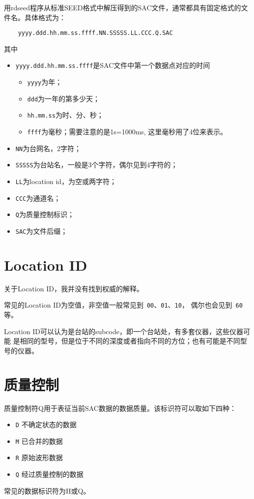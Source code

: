 用rdseed程序从标准SEED格式中解压得到的SAC文件，通常都具有固定格式的文件名。具体格式为：
\begin{verbatim}
    yyyy.ddd.hh.mm.ss.ffff.NN.SSSSS.LL.CCC.Q.SAC
\end{verbatim}
其中
\begin{itemize}
\item \verb+yyyy.ddd.hh.mm.ss.ffff+是SAC文件中第一个数据点对应的时间
    \begin{itemize}
    \item \verb+yyyy+为年；
    \item \verb+ddd+为一年的第多少天；
    \item \verb+hh.mm.ss+为时、分、秒；
    \item \verb+ffff+为毫秒；需要注意的是1s=1000ms, 这里毫秒用了4位来表示。
    \end{itemize}
\item \verb+NN+为台网名，2字符；
\item \verb+SSSSS+为台站名，一般是3个字符，偶尔见到4字符的；
\item \verb+LL+为location id，为空或两字符；
\item \verb+CCC+为通道名；
\item \verb+Q+为质量控制标识；
\item \verb+SAC+为文件后缀；
\end{itemize}

\section{Location ID}
关于Location ID，我并没有找到权威的解释。

常见的Location ID为空值，非空值一般常见到~\verb+00+、\verb+01+、\verb+10+，
偶尔也会见到~\verb+60+等。

Location ID可以认为是台站的subcode，即一个台站处，有多套仪器，这些仪器可能
是相同的型号，但是位于不同的深度或者指向不同的方位；也有可能是不同型号的仪器。

\section{质量控制}
质量控制符Q用于表征当前SAC数据的数据质量。该标识符可以取如下四种：
\begin{itemize}
\item \verb+D+ 不确定状态的数据
\item \verb+M+ 已合并的数据
\item \verb+R+ 原始波形数据
\item \verb+Q+ 经过质量控制的数据
\end{itemize}
常见的数据标识符为H或Q。

